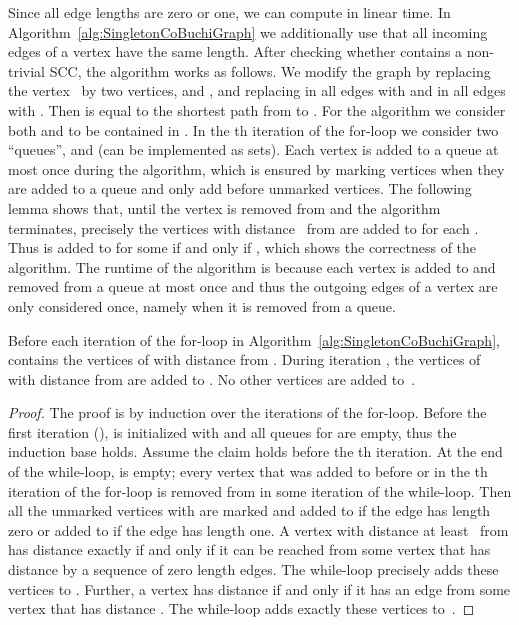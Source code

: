 \documentclass[11pt,letterpaper]{article}
\begin{document}
Since all edge lengths are zero or one, we can compute  in linear time. 
In Algorithm~\ref{alg:SingletonCoBuchiGraph} we additionally use that all 
incoming edges of a vertex have the same length. After checking whether
 contains a non-trivial SCC, the algorithm works as
follows. 
We modify the graph by replacing the vertex~ by two vertices,  
and , and replacing  in all edges  with 
 and in all edges  with .
Then  is equal to the shortest path from  to 
. For the algorithm we consider both  and 
 to be contained in .
In the th iteration of the for-loop we consider two ``queues'',
 and  (can be implemented as sets). Each vertex is added to a 
queue at most once during the 
algorithm, which is ensured by marking vertices when they are added to a queue
and only add before unmarked vertices. 
The following lemma shows that, until the vertex  is removed from 
 and the algorithm terminates,
precisely the vertices with distance~ from  are 
added to  for each . Thus  is added to  for some  if and 
only if , which shows the correctness of the algorithm.
The runtime of the algorithm is  because each vertex is added to and 
removed from a queue at most once and thus the outgoing edges of a vertex are
only considered once, namely when it is removed from a queue.
\begin{lemma}
 Before each iteration  of the for-loop in 
 Algorithm~\ref{alg:SingletonCoBuchiGraph},  contains
 the vertices of  with distance  from .
 During iteration , the vertices of 
 with distance  from  are added to . 
 No other vertices are added to~.
\end{lemma}
\begin{proof}
The proof is by induction over the iterations of the for-loop.
Before the first iteration (),  is initialized with 
and all queues  for  are empty, 
thus the induction base holds. Assume the claim holds before the th 
iteration.
At the end of the while-loop,  is empty; every vertex  that was added 
to  before or in the th iteration of the for-loop is removed from 
in some iteration of the while-loop. Then all the unmarked vertices  with 
 are marked and added to  if the edge  has length 
zero or added to  if the edge  has length one.
A vertex  with distance
at least~ from  has distance exactly  if and only if 
it can be reached from some vertex  that has distance 
by a sequence of zero length edges. The while-loop precisely adds these vertices
to . Further, a vertex  has distance  if and 
only if it has an edge from some vertex  that has distance .
The while-loop adds exactly these vertices to~.
\end{proof}
\end{document}
